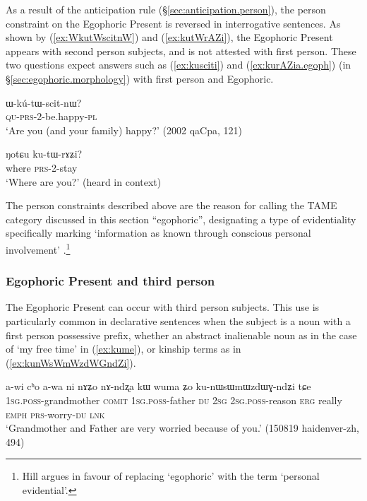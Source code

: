 As a result of the anticipation rule 
(§\ref{sec:anticipation.person}), the person constraint on the Egophoric Present is reversed in interrogative sentences. As shown by (\ref{ex:WkutWscitnW}) and (\ref{ex:kutWrAZi}), the Egophoric Present appears with second person subjects, and is not attested with first person. These two questions expect answers such as (\ref{ex:kusciti}) and (\ref{ex:kurAZia.egoph}) (in §\ref{sec:egophoric.morphology}) with first person and Egophoric.

\begin{exe}
	\ex \label{ex:WkutWscitnW}
	\gll ɯ-kú-tɯ-scit-nɯ? \\
	\textsc{qu}-\textsc{prs}-2-be.happy-\textsc{pl} \\
	\glt `Are you (and your family) happy?' (2002 qaCpa, 121)
\end{exe}

\begin{exe}
	\ex \label{ex:kutWrAZi}
	\gll ŋotɕu ku-tɯ-rɤʑi? \\
	where \textsc{prs}-2-stay \\
	\glt `Where are you?' (heard in context)
\end{exe}

The person constraints described above are the reason for calling the TAME category discussed in this section ``egophoric'', designating a type of evidentiality specifically marking `information as known through conscious personal involvement' \citep{hill20egophoricity}.\footnote{Hill argues in favour of replacing `egophoric' with the term `personal evidential'. } 
 
\subsubsection{Egophoric Present and third person} 
The Egophoric Present can occur with third person subjects. This use is particularly common in declarative sentences when the subject is a noun with a first person possessive prefix, whether an abstract inalienable noun as in the case of  `my free time' in (\ref{ex:kume}), or kinship terms as in (\ref{ex:kunWsWmWzdWGndZi}).

\begin{exe}
\ex \label{ex:kunWsWmWzdWGndZi}
\gll a-wi cʰo a-wa ni nɤʑo nɤ-ndʐa kɯ wuma ʑo ku-nɯsɯmɯzdɯɣ-ndʑi tɕe \\
\textsc{1sg}.\textsc{poss}-grandmother \textsc{comit} \textsc{1sg}.\textsc{poss}-father \textsc{du} \textsc{2sg} \textsc{2sg}.\textsc{poss}-reason \textsc{erg} really \textsc{emph} \textsc{prs}-worry-\textsc{du} \textsc{lnk} \\
\glt `Grandmother and Father are very worried because of you.' (150819 haidenver-zh, 494)
\end{exe}

